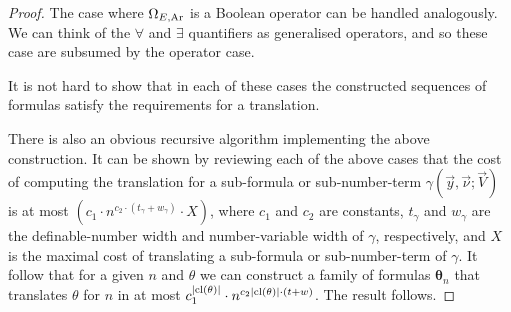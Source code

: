 \documentclass[../main/thesis.tex]{subfiles}
\begin{document}
\begin{proof}
  The case where $\Omega_{E, \text{\upshape Ar}}$ is a Boolean operator can be handled
  analogously. We can think of the $\forall$ and $\exists$ quantifiers as
  generalised operators, and so these case are subsumed by the operator case.

  It is not hard to show that in each of these cases the constructed sequences
  of formulas satisfy the requirements for a translation.
  
  There is also an obvious recursive algorithm implementing the above
  construction. It can be shown by reviewing each of the above cases that the
  cost of computing the translation for a sub-formula or sub-number-term $\gamma
  (\vec{y}, \vec{\nu} ; \vec{V})$ is at most $(c_1 \cdot n^{c_2 \cdot
    (t_{\gamma} + w_{\gamma} )} \cdot X)$, where $c_1$ and $c_2$ are constants,
  $t_{\gamma}$ and $w_{\gamma}$ are the definable-number width and
  number-variable width of $\gamma$, respectively, and $X$ is the maximal cost
  of translating a sub-formula or sub-number-term of $\gamma$. It follow that
  for a given $n$ and $\theta$ we can construct a family of formulas
  $\boldsymbol{\theta}_n$ that translates $\theta$ for $n$ in at most $c^{\vert
    \mathrm{cl}(\theta) \vert}_1 \cdot n^{c_2 \vert \mathrm{cl}(\theta) \vert \cdot (t + w)}$.
  The result follows.
\end{proof}


  
\end{document}
